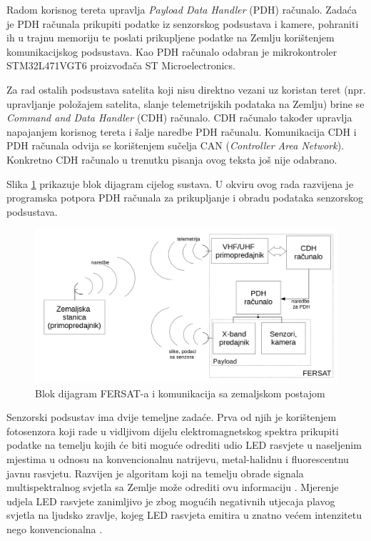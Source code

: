     Radom korisnog tereta upravlja \textit{Payload Data Handler} (PDH) računalo. Zadaća je PDH računala prikupiti podatke iz senzorskog podsustava i kamere, pohraniti ih u trajnu memoriju  te poslati prikupljene podatke na Zemlju korištenjem komunikacijskog podsustava. Kao PDH računalo odabran je mikrokontroler STM32L471VGT6 proizvođača ST Microelectronics.

    Za rad ostalih podsustava satelita koji nisu direktno vezani uz koristan teret (npr. upravljanje položajem satelita, slanje telemetrijskih podataka na Zemlju) brine se \textit{Command and Data Handler} (CDH) računalo. CDH računalo također upravlja napajanjem korisnog tereta i šalje naredbe PDH računalu. Komunikacija CDH i PDH računala odvija se korištenjem sučelja CAN (\textit{Controller Area Network}). Konkretno CDH računalo u trenutku pisanja ovog teksta još nije odabrano.

    Slika \ref{fig:fersat_blok} prikazuje blok dijagram cijelog sustava. U okviru ovog rada razvijena je programska potpora PDH računala za prikupljanje i obradu podataka senzorskog podsustava.
    
    \begin{figure}[htb]
        \centering
        \includegraphics[width=\textwidth]{slike/fersat_blok_dijagram.png}
        \caption{Blok dijagram FERSAT-a i komunikacija sa zemaljskom postajom \cite{diplomski_goran_petrak}}
        \label{fig:fersat_blok}
    \end{figure}

    Senzorski podsustav ima dvije temeljne zadaće. Prva od njih je korištenjem fotosenzora koji rade u vidljivom dijelu elektromagnetskog spektra prikupiti podatke na temelju kojih će biti moguće odrediti udio LED rasvjete u naseljenim mjestima u odnosu na konvencionalnu natrijevu, metal-halidnu i fluorescentnu javnu rasvjetu. Razvijen je algoritam koji na temelju obrade signala multispektralnog svjetla sa Zemlje može odrediti ovu informaciju \cite{diplomski_jakov_tutavac}. Mjerenje udjela LED rasvjete zanimljivo je zbog mogućih negativnih utjecaja plavog svjetla na ljudsko zravlje, kojeg LED rasvjeta emitira u znatno većem intenzitetu nego konvencionalna \cite{falchi_light_pollution}.

